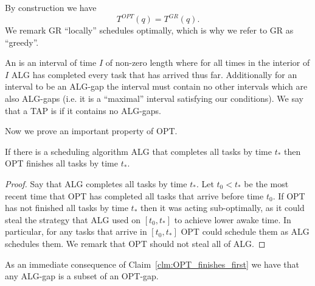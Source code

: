By construction we have
\begin{equation}
  \label{eq:same_single}
  T^{OPT}(q) = T^{GR}(q).
\end{equation}
We remark GR \enquote{locally} schedules optimally, which is why
we refer to GR as \enquote{greedy}. 

An  is an interval of time $I$ of non-zero length where for
all times in the interior of $I$ ALG has completed every
task that has arrived thus far. Additionally for an interval to
be an ALG-gap the interval must contain no other intervals which
are also ALG-gaps (i.e. it is a \enquote{maximal} interval
satisfying our conditions).
We say that a TAP is  if it contains no ALG-gaps.

Now we prove an important property of OPT.
\begin{claim}
  \label{clm:OPT_finishes_first}
  If there is a scheduling algorithm ALG that completes all tasks by
  time $t_*$ then OPT finishes all tasks by time $t_*$.
\end{claim}
\begin{proof}
  Say that ALG completes all tasks by time $t_*$. Let $t_0 < t_*$
  be the most recent time that OPT has completed all tasks that
  arrive before time $t_0$. If OPT has not finished all tasks by
  time $t_*$ then it was acting sub-optimally, as it could steal
  the strategy that ALG used on $[t_0, t_*]$ to achieve lower
  awake time. In particular, for any tasks that arrive in $[t_0,
  t_*]$ OPT could schedule them as ALG schedules them. We remark
  that OPT should not steal all of ALG. 
\end{proof}
As an immediate consequence of Claim~\ref{clm:OPT_finishes_first}
we have that any ALG-gap is a subset of an OPT-gap.


